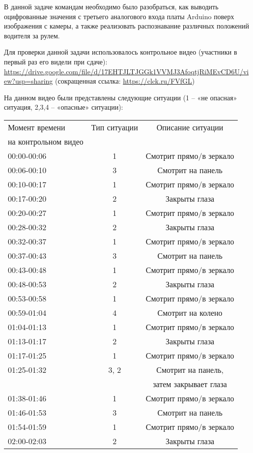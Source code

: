 \solutionSection

В данной задаче командам необходимо было разобраться, как выводить оцифрованные значения с третьего аналогового входа платы Arduino поверх изображения с камеры, а также реализовать распознавание различных положений водителя за рулем. 

Для проверки данной задачи использовалось контрольное видео (участники в первый раз его видели при сдаче): \url{https://drive.google.com/file/d/17EHTJLTJGGk1VVMJ3AfoqtjRiMEvCD6U/view?usp=sharing} (сокращенная ссылка: \url{https://clck.ru/FVfGL})

На данном видео были представлены следующие ситуации (1 – «не опасная» ситуация, 2,3,4 – «опасные» ситуации):

\begin{table}[H]
    \begin{tabular}{|l|c|c|}
        \hline
        Момент времени & Тип ситуации & Описание ситуации \\
        на контрольном видео & & \\
        \hline
        00:00-00:06 & 1 & Смотрит прямо/в зеркало \\
        00:06-00:10 & 3 & Смотрит на панель \\
        00:10-00:17 & 1 & Смотрит прямо/в зеркало \\
        00:17-00:20 & 2 & Закрыты глаза \\
        00:20-00:27 & 1 & Смотрит прямо/в зеркало \\
        00:28-00:32 & 2 & Закрыты глаза \\
        00:32-00:37 & 1 & Смотрит прямо/в зеркало \\
        00:37-00:43 & 3 & Смотрит на панель \\
        00:43-00:48 & 1 & Смотрит прямо/в зеркало \\
        00:48-00:53 & 2 & Закрыты глаза \\
        00:53-00:58 & 1 & Смотрит прямо/в зеркало \\
        00:59-01:04 & 4 & Смотрит на колено \\
        01:04-01:13 & 1 & Смотрит прямо/в зеркало \\
        01:13-01:17 & 2 & Закрыты глаза \\
        01:17-01:25 & 1 & Смотрит прямо/в зеркало \\
        01:25-01:32 & 3, 2 & Смотрит на панель, \\
        & & затем закрывает глаза \\
        01:38-01:46 & 1 & Смотрит прямо/в зеркало \\
        01:46-01:53 & 3 & Смотрит на панель \\
        01:54-01:59 & 1 & Смотрит прямо/в зеркало \\
        02:00-02:03 & 2 & Закрыты глаза \\
        \hline
    \end{tabular}
\end{table}


